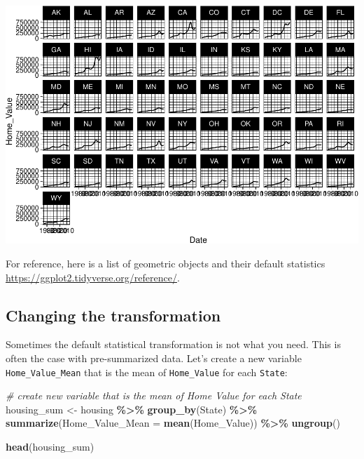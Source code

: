 \documentclass[
]{book}
\newenvironment{Shaded}{\begin{snugshade}}{\end{snugshade}}
\newcommand{\CommentTok}[1]{\textcolor[rgb]{0.56,0.35,0.01}{\textit{#1}}}
\newcommand{\DataTypeTok}[1]{\textcolor[rgb]{0.13,0.29,0.53}{#1}}
\newcommand{\KeywordTok}[1]{\textcolor[rgb]{0.13,0.29,0.53}{\textbf{#1}}}
\newcommand{\NormalTok}[1]{#1}
\newcommand{\OperatorTok}[1]{\textcolor[rgb]{0.81,0.36,0.00}{\textbf{#1}}}
\newcommand{\StringTok}[1]{\textcolor[rgb]{0.31,0.60,0.02}{#1}}
\begin{document}
\includegraphics{R/Rgraphics/figures/unnamed-chunk-182-1.pdf}

For reference, here is a list of geometric objects and their default statistics \url{https://ggplot2.tidyverse.org/reference/}.

\hypertarget{changing-the-transformation}{%
\subsection{Changing the transformation}\label{changing-the-transformation}}

Sometimes the default statistical transformation is not what you need. This is often the case with pre-summarized data. Let's create a new variable \texttt{Home\_Value\_Mean} that is the mean of \texttt{Home\_Value} for each \texttt{State}:

\begin{Shaded}
\begin{Highlighting}[]
\CommentTok{\# create new variable that is the mean of \textquotesingle{}Home Value\textquotesingle{} for each \textquotesingle{}State\textquotesingle{}}
\NormalTok{housing\_sum \textless{}{-}}\StringTok{ }
\StringTok{  }\NormalTok{housing }\OperatorTok{\%\textgreater{}\%}
\StringTok{  }\KeywordTok{group\_by}\NormalTok{(State) }\OperatorTok{\%\textgreater{}\%}
\StringTok{  }\KeywordTok{summarize}\NormalTok{(}\DataTypeTok{Home\_Value\_Mean =} \KeywordTok{mean}\NormalTok{(Home\_Value)) }\OperatorTok{\%\textgreater{}\%}
\StringTok{  }\KeywordTok{ungroup}\NormalTok{()}

\KeywordTok{head}\NormalTok{(housing\_sum)}
\end{Highlighting}
\end{Shaded}
\end{document}
